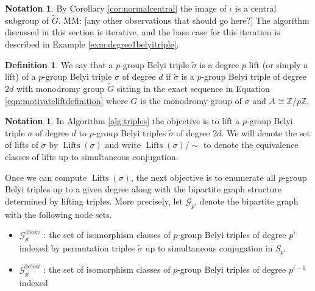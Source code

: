 \documentclass{dcthesis}
\newcommand{\ZZ}{\mathbb Z}
\newcommand{\defi}[1]{\textsf{#1}}
\newcommand{\mm}[1]{{\color{blue} \sf MM: [#1]}}
\newcommand{\wt}[1]{\widetilde{#1}}
\DeclareMathOperator{\Lifts}{Lifts}
\numberwithin{equation}{section}
\theoremstyle{definition}
\newtheorem{definition}[equation]{Definition}
\newtheorem{notation}[equation]{Notation}
\theoremstyle{remark}
\begin{document}
{{\begin{notation}
      By Corollary \ref{cor:normalcentral}
      the image of $\iota$
      is a central subgroup of $\wt{G}$.
      \mm{any other observations that
      should go here?}
      The algorithm discussed in this section
      is iterative,
      and the base case for this
      iteration is described in
      Example \ref{exm:degree1belyitriple}.
    \end{notation}
    \begin{definition}
      \label{def:lift}
      We say that a
      $p$-group Belyi
      triple $\wt{\sigma}$
      is a \defi{degree $p$ lift}
      (or simply a \defi{lift})
      of a $p$-group Belyi triple $\sigma$
      of degree $d$
      if $\wt{\sigma}$ is
      a $p$-group Belyi triple of degree $2d$
      with monodromy group $\wt{G}$
      sitting in the exact sequence
      in
      Equation
      \ref{eqn:motivateliftdefinition}
      where $G$ is the monodromy group of $\sigma$
      and $A\cong\ZZ/p\ZZ$.
    \end{definition}
    \begin{notation}
      \label{not:bipartitegraphs}
      In Algorithm \ref{alg:triples}
      the objective is to lift a
      $p$-group Belyi triple
      $\sigma$
      of degree $d$
      to $p$-group Belyi triples $\wt{\sigma}$
      of degree $2d$.
      We will denote the set
      of lifts of $\sigma$
      by $\Lifts(\sigma)$
      and write $\Lifts(\sigma)/\!\!\sim$
      to denote the equivalence classes
      of lifts up to simultaneous conjugation.
      \par
      Once we can compute
      $\Lifts(\sigma)$,
      the next objective is
      to enumerate all $p$-group Belyi
      triples up to a given degree
      along with the bipartite graph
      structure determined by lifting triples.
      More precisely,
      let
      $\mathscr{G}_{p^i}$ denote the bipartite
      graph with the following node sets.
      \begin{itemize}
        \item
          $\mathscr{G}_{p^i}^\text{above}$ :
          the set of isomorphism classes
          of $p$-group Belyi triples
          of degree $p^i$ indexed by
          permutation triples $\wt{\sigma}$
          up to simultaneous conjugation
          in $S_{p^i}$
        \item
          $\mathscr{G}_{p^i}^\text{below}$ :
          the set of isomorphism classes
          of $p$-group Belyi triples
          of degree $p^{i-1}$ indexed

\end{itemize}
\end{notation}}}
\end{document}
